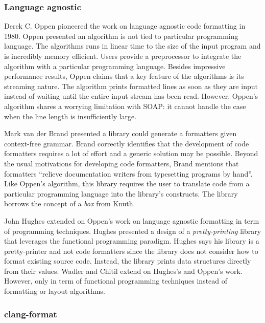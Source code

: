 \subsubsection{Language agnostic}
Derek C. Oppen pioneered the work on language agnostic code formatting in 1980\autocite{oppen_prettyprinting_1980}.
Oppen presented an algorithm is not tied to particular programming language.
The algorithms runs in linear time to the size of the input program and is incredibly memory efficient.
Users provide a preprocessor to integrate the algorithm with a particular programming language.
Besides impressive performance results, Oppen claims that a key feature of the algorithms is its streaming nature.
The algorithm prints formatted lines as soon as they are input instead of waiting until the entire input stream has been read.
However, Oppen's algorithm shares a worrying limitation with SOAP: it cannot handle the case when the line length is insufficiently large.

Mark van der Brand presented a library could generate a formatters given context-free grammar\autocite{van_den_brand_generation_1996}.
Brand correctly identifies that the development of code formatters requires a lot of effort and a generic solution may be possible.
Beyond the usual motivations for developing code formatters, Brand mentions that formatters ``relieve documentation writers from typesetting programs by hand''.
Like Oppen's algorithm, this library requires the user to translate code from a particular programming language into the library's constructs.
The library borrows the concept of a \emph{box} from Knuth\autocite{knuth_breaking_1981}.
 
John Hughes extended on Oppen's work on language agnostic formatting in term of programming techniques\autocite{hughes_design_1995}.
Hughes presented a design of a \emph{pretty-printing} library that leverages the functional programming paradigm.
Hughes says his library is a pretty-printer and not code formatters since the library does not consider how to format existing source code.
Instead, the library prints data structures directly from their values.
Wadler\autocite{wadler_prettier_2003} and Chitil\autocite{swierstra_linear_2009} extend on Hughes's and Oppen's work.
However, only in term of functional programming techniques instead of formatting or layout algorithms.



\subsubsection{clang-format}
